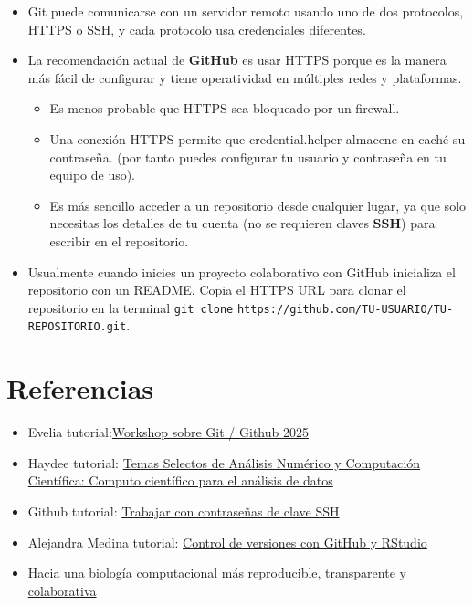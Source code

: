 \documentclass[
  spanish,
  12pt,
  letterpaper,
  DIV=11,
  numbers=noendperiod]{scrreprt}
\providecommand{\tightlist}{%
  \setlength{\itemsep}{0pt}\setlength{\parskip}{0pt}}
\begin{document}
\begin{itemize}
\item
  Git puede comunicarse con un servidor remoto usando uno de dos
  protocolos, HTTPS o SSH, y cada protocolo usa credenciales diferentes.
\item
  La recomendación actual de \textbf{GitHub} es usar HTTPS porque es la
  manera más fácil de configurar y tiene operatividad en múltiples redes
  y plataformas.

  \begin{itemize}
  \item
    Es menos probable que HTTPS sea bloqueado por un firewall.
  \item
    Una conexión HTTPS permite que credential.helper almacene en caché
    su contraseña. (por tanto puedes configurar tu usuario y contraseña
    en tu equipo de uso).
  \item
    Es más sencillo acceder a un repositorio desde cualquier lugar, ya
    que solo necesitas los detalles de tu cuenta (no se requieren claves
    \textbf{SSH}) para escribir en el repositorio.
  \end{itemize}
\item
  Usualmente cuando inicies un proyecto colaborativo con GitHub
  inicializa el repositorio con un README. Copia el HTTPS URL para
  clonar el repositorio en la terminal \texttt{git\ clone}
  \texttt{https://github.com/TU-USUARIO/TU-REPOSITORIO.git}.
\end{itemize}

\section{Referencias}\label{referencias-11}

\begin{itemize}
\tightlist
\item
  Evelia
  tutorial:\href{https://eveliacoss.github.io/Workshop_GitGithub2025/}{Workshop
  sobre Git / Github 2025}
\item
  Haydee tutorial:
  \href{https://haydeeperuyero.github.io/Computo_Cientifico/}{Temas
  Selectos de Análisis Numérico y Computación Científica: Computo
  científico para el análisis de datos}
\item
  Github tutorial:
  \href{https://docs.github.com/es/authentication/connecting-to-github-with-ssh/working-with-ssh-key-passphrases}{Trabajar
  con contraseñas de clave SSH}
\item
  Alejandra Medina tutorial:
  \href{https://comunidadbioinfo.github.io/cdsb2023/control-de-versiones-con-github-y-rstudio.html}{Control
  de versiones con GitHub y RStudio}
\item
  \href{https://ellipse.prbb.org/es/hacia-una-biologia-computacional-mas-reproducible-transparente-y-colaborativa/}{Hacia
  una biología computacional más reproducible, transparente y
  colaborativa}
\end{itemize}
\end{document}
